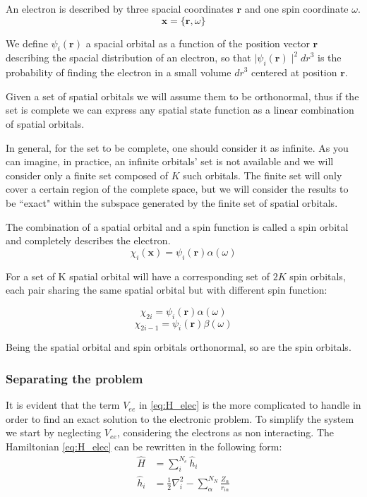 \documentclass[a4paper,12pt]{article}
\begin{document}
An electron is described by three spacial coordinates $\mathbf{r}$ and one spin coordinate $\omega$.
\begin{equation}
	\mathbf{x} = \{\mathbf{r},\omega\}
\end{equation}

We define $\psi_i(\mathbf{r})$ a spacial orbital as a function of the position vector $\mathbf{r}$ describing the spacial distribution of an electron, so that $\mid\psi_i(\mathbf{r})\mid^2 {dr}^3$ is the probability of finding the electron in a small volume ${dr}^3$ centered at position $\mathbf{r}$.

Given a set of spatial orbitals we will assume them to be orthonormal, thus if the set is complete we can express any spatial state function as a linear combination of spatial orbitals.

In general, for the set to be complete, one should consider it as infinite. As you can imagine, in practice, an infinite orbitals' set is not available and we will consider only a finite set composed of $K$ such orbitals. The finite set will only cover a certain region of the complete space, but we will consider the results to be ``exact" within the subspace generated by the finite set of spatial orbitals.

The combination of a spatial orbital and a spin function is called a spin orbital and completely describes the electron. 
\begin{equation}
	\chi_{i}(\mathbf{x}) = \psi_i(\mathbf{r}) \alpha(\omega)
\end{equation}


For a set of K spatial orbital will have a corresponding set of $2K$ spin orbitals, each pair sharing the same spatial orbital but with different spin function:

\begin{equation}
	\chi_{2i} = \psi_i(\mathbf{r}) \alpha(\omega)
\end{equation}
\begin{equation}
	\chi_{2i-1} = \psi_i(\mathbf{r}) \beta(\omega)
\end{equation}

Being the spatial orbital and spin orbitals orthonormal, so are the spin orbitals.

\subsubsection{Separating the problem}

It is evident that the term $V_{ee}$ in \eqref{eq:H_elec} is the more complicated to handle in order to find an exact solution to the electronic problem.
To simplify the system we start by neglecting $V_{ee}$, considering the electrons as non interacting.
The Hamiltonian \eqref{eq:H_elec} can be rewritten in the following form:
\begin{align}
	\hat{H} & = \sum_{i}^{N_{e}} \hat{h}_{i} \label{eq:HartreeHamiltonian} 
	\\
	\hat{h}_{i} & = \frac{1}{2} \nabla_{i}^2 - \sum_{\alpha}^{N_{N}} \frac{Z_{\alpha}}{r_{i\alpha}}  \label{eq:singleElHam}
\end{align}
\end{document}
